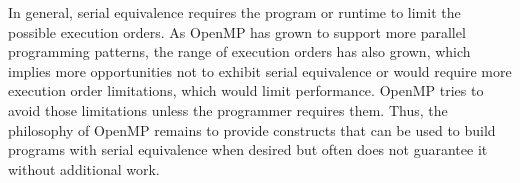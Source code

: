 In general, serial equivalence requires the program or runtime to limit the
possible execution orders. As OpenMP has grown to support more parallel
programming patterns, the range of execution orders has also grown, which
implies more opportunities not to exhibit serial equivalence or would require
more execution order limitations, which would limit performance. OpenMP tries
to avoid those limitations unless the programmer requires them. Thus, the
philosophy of OpenMP remains to provide constructs that can be used to build
programs with serial equivalence when desired but often does not guarantee
it without additional work.

